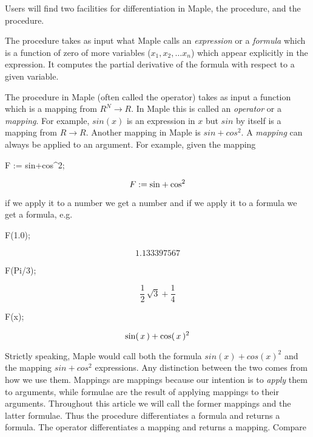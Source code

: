 \documentclass[11pt,dvips]{mtn}
\begin{document}
Users will find two facilities for differentiation in Maple,
the  procedure, and the  procedure.

The  procedure takes as input what Maple calls
an {\em expression} or a {\em formula} which is a function of
zero of more variables ($x_1, x_2, \ldots x_n$) which appear explicitly
in the expression.
It computes the partial derivative of the formula with respect to
a given variable.

The  procedure in Maple (often called the
 operator) takes as input a function which is
a mapping from $R^N \rightarrow R$.  In Maple this is called an
{\em operator} or a {\em mapping}.
For example, $sin(x)$ is an expression in $x$ but $sin$ by itself is a
mapping from $R \rightarrow R$.
Another mapping in Maple is $sin+cos^2$.
A {\em mapping} can always be applied to an argument.
For example, given the mapping

\begin{mapleinput}
F := sin+cos^2;
\end{mapleinput}
\begin{maplelatex}
\[
{F} := {\rm sin} + {\rm cos}^{2}
\]
\end{maplelatex}
if we apply it to a number we get a number and if we apply
it to a formula we get a formula, e.g.

\begin{mapleinput}
F(1.0);
\end{mapleinput}
\begin{maplelatex}
\[
1.133397567
\]
\end{maplelatex}
\begin{mapleinput}
F(Pi/3);
\end{mapleinput}
\begin{maplelatex}
\[
{\displaystyle \frac {1}{2}}\,\sqrt {3} + {\displaystyle \frac {1
}{4}}
\]
\end{maplelatex}
\begin{mapleinput}
F(x);
\end{mapleinput}
\begin{maplelatex}
\[
{\rm sin}(\,{x}\,) + {\rm cos}(\,{x}\,)^{2}
\]
\end{maplelatex}

Strictly speaking,
Maple would call both the formula $sin(x) + cos(x)^2$ and
the mapping $sin + cos^2$ expressions.
Any distinction between the two comes from how we use them.
Mappings are mappings because our intention is
to {\em apply} them to arguments, while formulae are the
result of applying mappings to their arguments.
Throughout this article we will call the former
mappings and the latter formulae.
Thus the  procedure differentiates a formula and returns
a formula.  The  operator differentiates a mapping
and returns a mapping.  Compare
\end{document}
